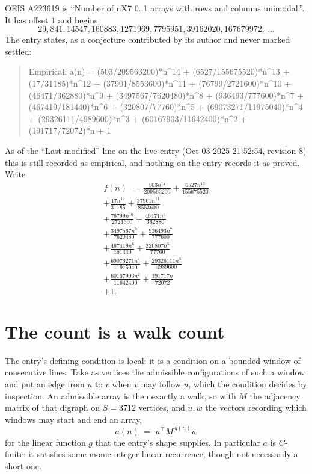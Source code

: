 \documentclass[11pt,a4paper]{article}
\theoremstyle{plain}
\theoremstyle{definition}
\begin{document}
OEIS A223619 is ``Number of nX7 0..1 arrays with rows and columns unimodal.''. It has offset $1$ and begins
\[
29, 841, 14547, 160883, 1271969, 7795951, 39162020, 167679972,\ \dots
\]
The entry states, as a conjecture contributed by its author and never marked settled:
\begin{quote}
Empirical: a(n) = (503/209563200)*n\^{}14 + (6527/155675520)*n\^{}13 + (17/31185)*n\^{}12 + (37901/8553600)*n\^{}11 + (76799/2721600)*n\^{}10 + (46471/362880)*n\^{}9 + (3497567/7620480)*n\^{}8 + (936493/777600)*n\^{}7 + (467419/181440)*n\^{}6 + (320807/77760)*n\^{}5 + (69073271/11975040)*n\^{}4 + (29326111/4989600)*n\^{}3 + (60167903/11642400)*n\^{}2 + (191717/72072)*n + 1
\end{quote}
As of the ``Last modified'' line on the live entry (Oct 03 2025 21:52:54, revision 8) this is still
recorded as empirical, and nothing on the entry records it as proved. Write
\begin{multline*}
f(n)\;=\;\frac{503 n^{14}}{209563200} + \frac{6527 n^{13}}{155675520} \\
+ \frac{17 n^{12}}{31185} + \frac{37901 n^{11}}{8553600} \\
+ \frac{76799 n^{10}}{2721600} + \frac{46471 n^{9}}{362880} \\
+ \frac{3497567 n^{8}}{7620480} + \frac{936493 n^{7}}{777600} \\
+ \frac{467419 n^{6}}{181440} + \frac{320807 n^{5}}{77760} \\
+ \frac{69073271 n^{4}}{11975040} + \frac{29326111 n^{3}}{4989600} \\
+ \frac{60167903 n^{2}}{11642400} + \frac{191717 n}{72072} \\
+ 1.
\end{multline*}

\section{The count is a walk count}

The entry's defining condition is local: it is a condition on a bounded window of consecutive lines. Take as vertices the
admissible configurations of such a window and put an edge from $u$ to $v$ when $v$ may
follow $u$, which the condition decides by inspection. An admissible array is then exactly a
walk, so with $M$ the adjacency matrix of that digraph on $S=3712$ vertices, and $u,w$ the
vectors recording which windows may start and end an array,
\[
a(n)\;=\;u^{\!\top}M^{\,g(n)}w
\]
for the linear function $g$ that the entry's shape supplies. In particular $a$ is
$C$-finite: it satisfies some monic integer linear recurrence, though not necessarily a short
one.
\end{document}
